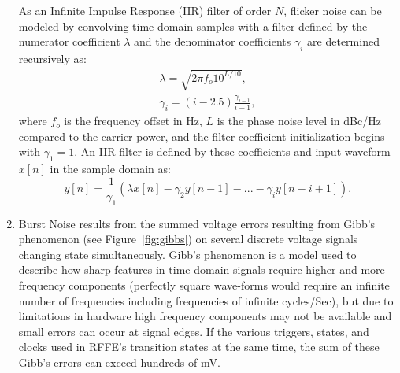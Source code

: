 \begin{enumerate}
As an Infinite Impulse Response (IIR) filter of order $N$, flicker noise can be modeled by convolving time-domain samples with a filter defined by the numerator coefficient $\lambda$ and the denominator coefficients $\gamma_i$ are determined recursively as:
\begin{subequations}
\label{eq:flickerIIR}
\begin{align}
\lambda = \sqrt{2\pi f_{o}10^{L/10}},
\\
\gamma_i = (i-2.5) \frac{\gamma_{i-1}}{i-1},
\end{align}
\end{subequations}
where $f_{o}$ is the frequency offset in Hz, $L$ is the phase noise level in dBc/Hz compared to the carrier power, and the filter coefficient initialization begins with $\gamma_1 = 1$. An IIR filter is defined by these coefficients and input waveform $x[n]$ in the sample domain as:
\begin{equation}
\label{eq:IIRdef}
y[n] = \frac{1}{\gamma_1} (\lambda x[n] - \gamma_2 y[n-1] - ... - \gamma_i y[n-i+1]).
\end{equation}
    
    \item Burst Noise results from the summed voltage errors resulting from Gibb's phenomenon (see Figure~\ref{fig:gibbs}) on several discrete voltage signals changing state simultaneously. Gibb's phenomenon is a model used to describe how sharp features in time-domain signals require higher and more frequency components (perfectly square wave-forms would require an infinite number of frequencies including frequencies of infinite cycles/Sec), but due to limitations in hardware high frequency components may not be available and small errors can occur at signal edges. If the various triggers, states, and clocks used in RFFE's transition states at the same time, the sum of these Gibb's errors can exceed hundreds of mV.
    

\end{enumerate}
